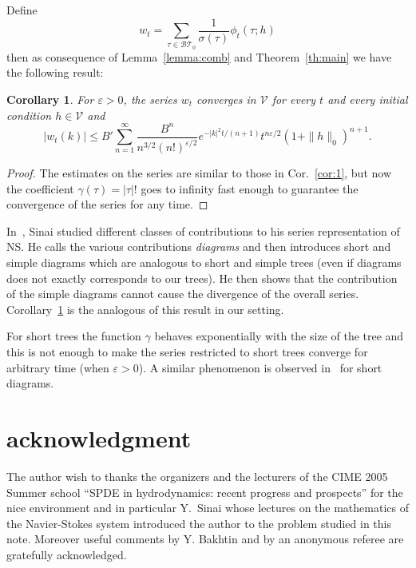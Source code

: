 \documentclass[a4paper,12pt,reqno]{amsart}
\newcommand{\1}{{\bf 1}}
\newcommand{\eps}{\varepsilon}
\newtheorem{corollary}[theorem]{Corollary}
\newcommand{\VV}{\mathcal{V}}
\newcommand{\BT}{\mathcal{BT}}
\begin{document}
Define
$$
w_t = \sum_{\tau \in \BT_0} \frac{1}{\sigma(\tau)} \phi_{t}(\tau; h)
$$
then as consequence of Lemma~\ref{lemma:comb} and Theorem~\ref{th:main} we have the following result: 

\begin{corollary}
\label{cor:exp-decay}
For $\eps > 0$,
the series $w_t$ converges in $\VV$ for every $t$ and every initial condition
$h\in\VV$ and
$$
|w_t(k)| \le B' \sum_{n=1}^\infty  \frac{B^n}{n^{3/2} (n!)^{\eps/2}} e^{-|k|^2 t / (n+1)}
t^{n \eps /2} (1+\|h\|_0)^{n+1}. 
$$
\end{corollary}
\begin{proof}
The estimates on the series are similar to those in Cor.~\ref{cor:1}, but now the coefficient $\gamma(\tau) = |\tau|!$ goes to infinity fast enough to guarantee the convergence of the series for any time.  
\end{proof}


In~\cite{Sinai3}, Sinai studied different classes of contributions to
his series representation of NS. He calls the various contributions
\emph{diagrams} and then introduces short and simple diagrams which
are analogous to short and simple trees (even if diagrams does not
exactly corresponds to our trees). He then shows that the contribution
of the simple diagrams cannot cause the divergence of the overall
series. Corollary~\ref{cor:exp-decay} is the analogous of this result
in our setting.

For short trees the function $\gamma$ behaves exponentially with the
size of the tree and this is not enough to make the series restricted
to short trees converge for arbitrary time (when $\eps > 0$). 
A similar phenomenon is observed in~\cite{Sinai3} for short
diagrams.




\section*{acknowledgment}
The author wish to thanks the organizers and the lecturers of the CIME 2005 Summer
school ``SPDE in hydrodynamics: recent progress and prospects'' for the nice environment
and in particular Y.~Sinai whose lectures on the mathematics of
the Navier-Stokes system introduced the author to the problem studied in this note. Moreover useful comments by
Y. Bakhtin and by an anonymous referee are gratefully acknowledged.
   
\end{document}
